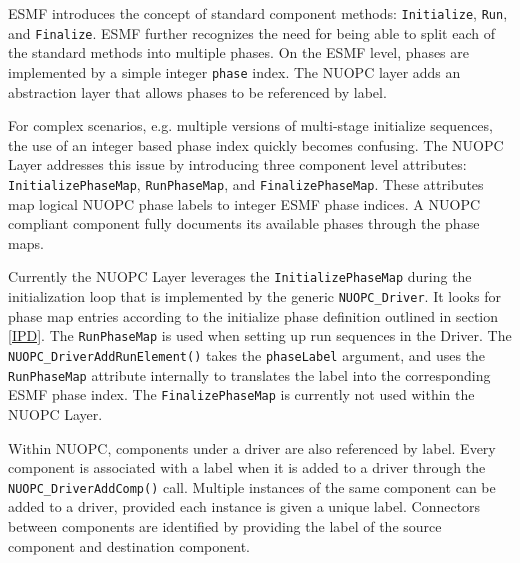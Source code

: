 %

\label{PhaseMaps}

ESMF introduces the concept of standard component methods: {\tt Initialize}, {\tt Run}, and {\tt Finalize}. ESMF further recognizes the need for being able to split each of the standard methods into multiple phases. On the ESMF level, phases are implemented by a simple integer {\tt phase} index. The NUOPC layer adds an abstraction layer that allows phases to be referenced by label.

For complex scenarios, e.g. multiple versions of multi-stage initialize sequences, the use of an integer based phase index quickly becomes confusing. The NUOPC Layer addresses this issue by introducing three component level attributes: {\tt InitializePhaseMap}, {\tt RunPhaseMap}, and {\tt FinalizePhaseMap}. These attributes map logical NUOPC phase labels to integer ESMF phase indices. A NUOPC compliant component fully documents its available phases through the phase maps.

Currently the NUOPC Layer leverages the {\tt InitializePhaseMap} during the initialization loop that is implemented by the generic {\tt NUOPC\_Driver}. It looks for phase map entries according to the initialize phase definition outlined in section \ref{IPD}. The {\tt RunPhaseMap} is used when setting up run sequences in the Driver. The {\tt NUOPC\_DriverAddRunElement()} takes the {\tt phaseLabel} argument, and uses the {\tt RunPhaseMap} attribute internally to translates the label into the corresponding ESMF phase index. The {\tt FinalizePhaseMap} is currently not used within the NUOPC Layer.

Within NUOPC, components under a driver are also referenced by label. Every component is associated with a label when it is added to a driver through the {\tt NUOPC\_DriverAddComp()} call. Multiple instances of the same component can be added to a driver, provided each instance is given a unique label. Connectors between components are identified by providing the label of the source component and destination component.
